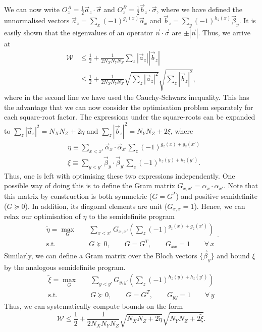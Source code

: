 \documentclass[aps,superscriptaddress,twocolumn,twoside,floatfix,pra,nofootinbib,a4paper]{revtex4-2}
\newcommand{\moha}[1]{\textit{\small\textcolor{cyan}{moha: #1}}}
\begin{document}
We can now write $O^A_z=\frac{1}{2}\vec{a}_z\cdot \vec{\sigma}$ and $O^B_z=\frac{1}{2}\vec{b}_z\cdot \vec{\sigma}$, where we have defined the unnormalised vectors $\vec{a}_z=\sum_{x}(-1)^{g_z(x)}\vec{\alpha}_x$ and $\vec{b}_z=\sum_{y}(-1)^{h_z(x)}\vec{\beta}_y$. It is easily shown that the  eigenvalues of an operator $\vec{n}\cdot\vec{\sigma}$ are $\pm |\vec{n}|$. Thus, we arrive at
\begin{align}\nonumber
	\mathcal{W}&\leq \frac{1}{2}+\frac{1}{2N_XN_YN_Z}\sum_{z} |\vec{a}_z||\vec{b}_z|\\
	&\leq \frac{1}{2}+\frac{1}{2N_XN_YN_Z}\sqrt{\sum_{z} |\vec{a}_z|^2}\sqrt{\sum_{z} |\vec{b}_z|^2},
\end{align}
where in the second line we have used the Cauchy-Schwarz inequality. This has the advantage that we can now consider the optimisation problem separately for each square-root factor. The expressions under the square-roots can be expanded to $\sum_z |\vec{a}_z|^2=N_XN_Z+2\eta$ and $\sum_z |\vec{b}_z|^2=N_YN_Z+2\xi$, where
\begin{align}
	&{\eta}\equiv \sum_{x<x'} \vec{\alpha}_x\cdot \vec{\alpha}_{x'} \sum_z(-1)^{g_z(x)+g_z(x')}\\
	& \xi\equiv \sum_{y<y'} \vec{\beta}_y\cdot \vec{\beta}_{y'}\sum_z  (-1)^{h_z(y)+h_z(y')}.
\end{align}
Thus, one is left with optimising these two expressions independently. One possible way of doing this is to define the Gram matrix $G_{x,x'}=\alpha_{x}\cdot \alpha_{x'}$.  Note that this matrix  by construction is both symmetric ($G=G^T$) and positive semidefinite ($G\succeq 0$). In addition, its diagonal elements are unit ($G_{x,x}=1$). Hence, we can relax our optimisation of $\eta$ to the semidefinite program 
\begin{equation}
\begin{aligned}\label{eq:alpha_tilde}
\tilde{\eta}=\max_G \quad & \sum_{x<x'} G_{x,x'}\left(\sum_z (-1)^{g_z(x)+g_z(x')}\right)\\
\textrm{s.t.}\quad & G\succeq 0,\qquad  G=G^T, \qquad G_{xx}=1 \qquad \forall \,x
\end{aligned}.
\end{equation}
Similarly, we can define a Gram matrix over the Bloch vectors $\{\vec{\beta}_y\}$ and bound $\xi$ by the analogous semidefinite program.
\begin{equation}
\begin{aligned}\label{eq:beta_tilde}
\tilde{\xi}=\max_G \quad & \sum_{y<y'} G_{y,y'}\left(\sum_z (-1)^{h_z(y)+h_z(y')}\right)\\
\textrm{s.t.}\quad & G\succeq 0,\qquad  G=G^T, \qquad G_{yy}=1 \qquad \forall \,y
\end{aligned}
\end{equation}
Thus, we can systematically compute bounds on the form
\begin{equation}\label{appbound}
\mathcal{W}\leq \frac{1}{2}+\frac{1}{2N_XN_YN_Z}\sqrt{N_XN_Z+2\tilde{\eta}}\sqrt{N_YN_Z +2\tilde{\xi}}.
\end{equation}
\end{document}
